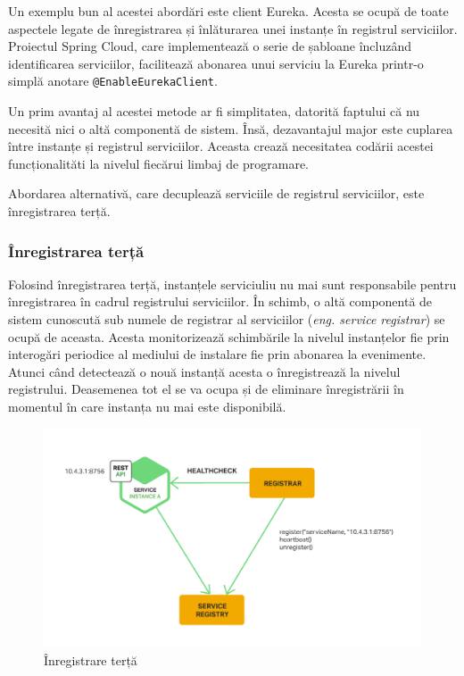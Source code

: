 \documentclass[12pt, a4paper, oneside, romanian]{teza-upb}
\begin{document}
Un exemplu bun al acestei abordări este client Eureka. Acesta se ocupă de toate aspectele legate de înregistrarea și înlăturarea unei instanțe în registrul serviciilor. Proiectul Spring Cloud, care implementează o serie de șabloane încluzând identificarea serviciilor, facilitează abonarea unui serviciu la Eureka printr-o simplă anotare \texttt{@EnableEurekaClient}.

Un prim avantaj al acestei metode ar fi simplitatea, datorită faptului că nu necesită nici o altă componentă de sistem. Însă, dezavantajul major este cuplarea între instanțe și registrul serviciilor. Aceasta crează necesitatea codării acestei funcționalităti la nivelul fiecărui limbaj de programare.

Abordarea alternativă, care decuplează serviciile de registrul serviciilor, este înregistrarea terță.
\newpage
\subsubsection{Înregistrarea terță}
Folosind înregistrarea terță, instanțele serviciuliu nu mai sunt responsabile pentru înregistrarea în cadrul registrului serviciilor. În schimb, o altă componentă de sistem cunoscută sub numele de registrar al serviciilor (\textit{eng. service registrar}) se ocupă de aceasta. Acesta monitorizează schimbările la nivelul instanțelor fie prin interogări periodice al mediului de instalare fie prin abonarea la evenimente. Atunci când detectează o nouă instanță acesta o înregistrează la nivelul registrului. Deasemenea tot el se va ocupa și de eliminare înregistrării în momentul în care instanța nu mai este  disponibilă. 

\begin{figure}[ht]
\centering
\includegraphics[scale=0.4]{img/Richardson-microservices-part4-5_third-party-pattern.png}
\caption{Înregistrare terță}
\label{fig:arhi_componente}
\end{figure}
\end{document}
